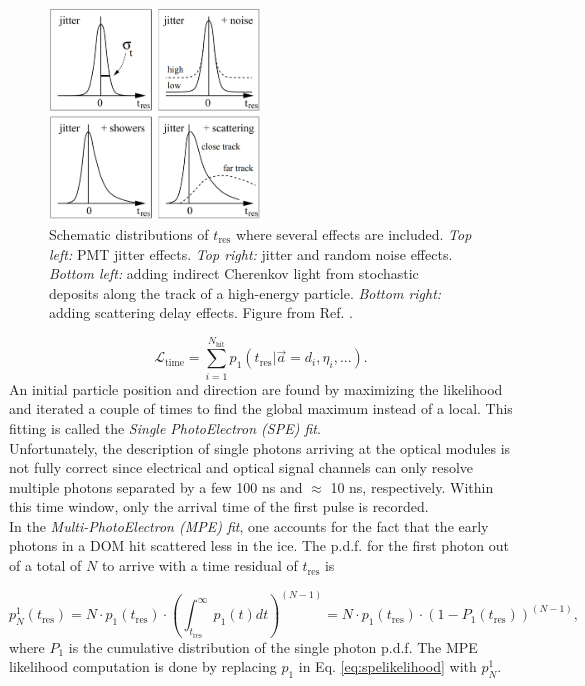 \begin{figure}[t]
\centering
\includegraphics[width=0.5\textwidth]{chapter7/img/spempejitter.png}
\caption{Schematic distributions of $t_\textrm{res}$ where several effects are included. \textit{Top left: }PMT jitter effects. \textit{Top right: }jitter and random noise effects. \textit{Bottom left: }adding indirect Cherenkov light from stochastic deposits along the track of a high-energy particle. \textit{Bottom right: }adding scattering delay effects. Figure from Ref. \cite{Ahrens:2003fg}.}
\label{fig:spempejitter}
\end{figure}

\begin{equation}
\label{eq:spelikelihood}
\mathcal{L}_\textrm{time} = \sum^{N_\textrm{hit}}_{i=1} p_1 (t_\textrm{res} | \vec{a} = {d_i,\eta_i,...}).
\end{equation}
\noindent An initial particle position and direction are found by maximizing the likelihood and iterated a couple of times to find the global maximum instead of a local. This fitting is called the \textit{Single PhotoElectron (SPE) fit}.\\

\noindent Unfortunately, the description of single photons arriving at the optical modules is not fully correct since electrical and optical signal channels can only resolve multiple photons separated by a few 100 ns and $\approx$ 10 ns, respectively. Within this time window, only the arrival time of the first pulse is recorded.\\

\noindent In the \textit{Multi-PhotoElectron (MPE) fit}, one accounts for the fact that the early photons in a DOM hit scattered less in the ice. The p.d.f. for the first photon out of a total of $N$ to arrive with a time residual of $t_\textrm{res}$ is

\begin{equation}
p^1_N (t_\textrm{res}) = N \cdot p_1(t_\textrm{res}) \cdot \left(\int^\infty_{t_\textrm{res}} p_1(t) dt \right)^{(N-1)} = N \cdot p_1 (t_\textrm{res}) \cdot (1-P_1 (t_\textrm{res}))^{(N-1)},
\end{equation}
\noindent where $P_1$ is the cumulative distribution of the single photon p.d.f. The MPE likelihood computation is done by replacing $p_1$ in Eq. \ref{eq:spelikelihood} with $p^1_N$.\\

